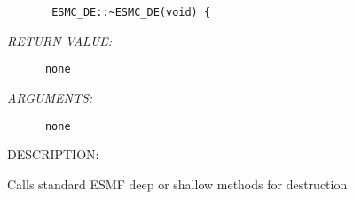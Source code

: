   
\begin{verbatim}       ESMC_DE::~ESMC_DE(void) {\end{verbatim}{\em RETURN VALUE:}
\begin{verbatim}      none\end{verbatim}{\em ARGUMENTS:}
\begin{verbatim}      none\end{verbatim}
{\sf DESCRIPTION:\\ }


        Calls standard ESMF deep or shallow methods for destruction
  
